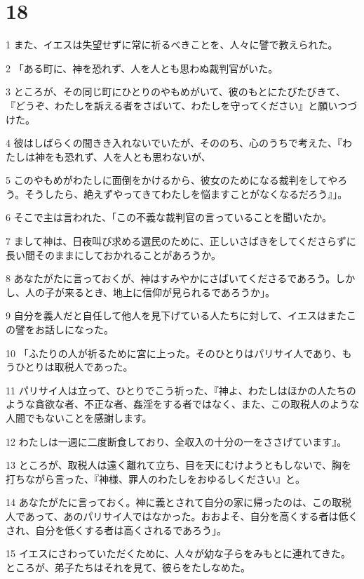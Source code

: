 \chapter{18}

\par 1 また、イエスは失望せずに常に祈るべきことを、人々に譬で教えられた。
\par 2 「ある町に、神を恐れず、人を人とも思わぬ裁判官がいた。
\par 3 ところが、その同じ町にひとりのやもめがいて、彼のもとにたびたびきて、『どうぞ、わたしを訴える者をさばいて、わたしを守ってください』と願いつづけた。
\par 4 彼はしばらくの間きき入れないでいたが、そののち、心のうちで考えた、『わたしは神をも恐れず、人を人とも思わないが、
\par 5 このやもめがわたしに面倒をかけるから、彼女のためになる裁判をしてやろう。そうしたら、絶えずやってきてわたしを悩ますことがなくなるだろう』」。
\par 6 そこで主は言われた、「この不義な裁判官の言っていることを聞いたか。
\par 7 まして神は、日夜叫び求める選民のために、正しいさばきをしてくださらずに長い間そのままにしておかれることがあろうか。
\par 8 あなたがたに言っておくが、神はすみやかにさばいてくださるであろう。しかし、人の子が来るとき、地上に信仰が見られるであろうか」。
\par 9 自分を義人だと自任して他人を見下げている人たちに対して、イエスはまたこの譬をお話しになった。
\par 10 「ふたりの人が祈るために宮に上った。そのひとりはパリサイ人であり、もうひとりは取税人であった。
\par 11 パリサイ人は立って、ひとりでこう祈った、『神よ、わたしはほかの人たちのような貪欲な者、不正な者、姦淫をする者ではなく、また、この取税人のような人間でもないことを感謝します。
\par 12 わたしは一週に二度断食しており、全収入の十分の一をささげています』。
\par 13 ところが、取税人は遠く離れて立ち、目を天にむけようともしないで、胸を打ちながら言った、『神様、罪人のわたしをおゆるしください』と。
\par 14 あなたがたに言っておく。神に義とされて自分の家に帰ったのは、この取税人であって、あのパリサイ人ではなかった。おおよそ、自分を高くする者は低くされ、自分を低くする者は高くされるであろう」。
\par 15 イエスにさわっていただくために、人々が幼な子らをみもとに連れてきた。ところが、弟子たちはそれを見て、彼らをたしなめた。
